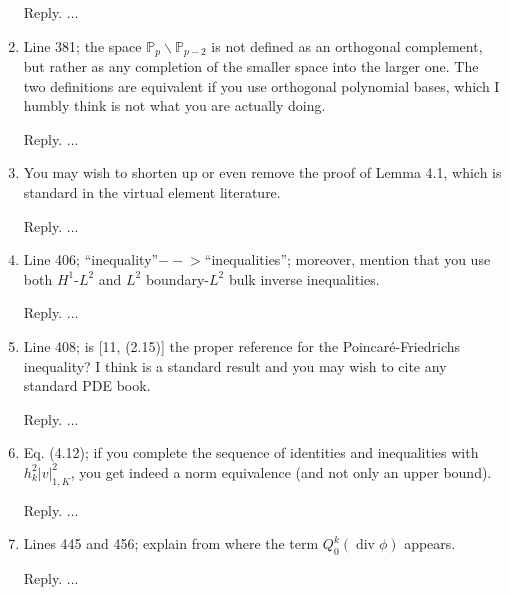 \documentclass[10pt]{amsart}
\theoremstyle{definition}
\theoremstyle{remark}
\renewcommand{\div}{\operatorname{div}}
\begin{document}
\begin{enumerate}[1.]
\smallskip \noindent \textcolor[rgb]{1.00,0.00,0.00}{Reply.}
...

\medskip

\item \textsf{Line 381; the space $\mathbb P_p\backslash\mathbb P_{p-2}$ is not defined as an orthogonal complement, but rather as any completion of the smaller space into the larger one. The two definitions are equivalent if you use orthogonal polynomial bases, which I humbly think is not what you are actually doing.}

\smallskip \noindent \textcolor[rgb]{1.00,0.00,0.00}{Reply.}
...

\medskip

\item \textsf{You may wish to shorten up or even remove the proof of Lemma 4.1, which is standard in the virtual element literature.}

\smallskip \noindent \textcolor[rgb]{1.00,0.00,0.00}{Reply.}
...

\medskip

\item \textsf{Line 406; “inequality”$-\!\!\!-\!\!\!>$“inequalities”; moreover, mention that you use both $H^1$-$L^2$ and $L^2$ boundary-$L^2$ bulk inverse inequalities.}

\smallskip \noindent \textcolor[rgb]{1.00,0.00,0.00}{Reply.}
...

\medskip

\item \textsf{Line 408; is [11, (2.15)] the proper reference for the Poincar\'e-Friedrichs inequality? I think is a standard result and you may wish to cite any standard PDE book.}

\smallskip \noindent \textcolor[rgb]{1.00,0.00,0.00}{Reply.}
...

\medskip

\item \textsf{Eq. (4.12); if you complete the sequence of identities and inequalities with $h_k^2|v|_{1,K}^2$, you get indeed a norm equivalence (and not only an upper bound).}

\smallskip \noindent \textcolor[rgb]{1.00,0.00,0.00}{Reply.}
...

\medskip

\item \textsf{Lines 445 and 456; explain from where the term $Q_0^k(\div\phi)$ appears.}

\smallskip \noindent \textcolor[rgb]{1.00,0.00,0.00}{Reply.}
...


\end{enumerate}
\end{document}
